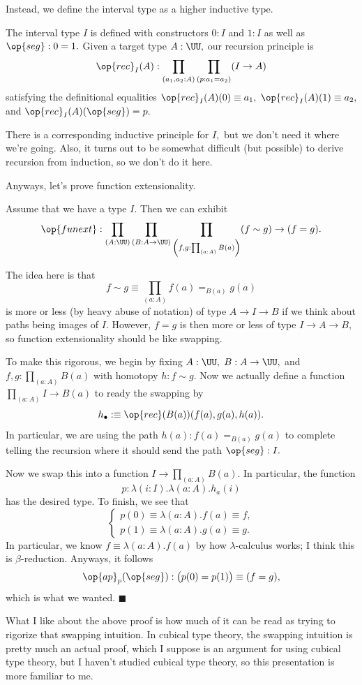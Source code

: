 Instead, we define the interval type as a higher inductive type.
\begin{definition}
    The interval type $I$ is defined with constructors $0:I$ and $1:I$ as well as $\op{seg}:0=1.$ Given a target type $A:\UU,$ our recursion principle is
    \[\op{rec}_I(A):\prod_{(a_1,a_2:A)}\prod_{(p:a_1=a_2)}(I\to A)\]
    satisfying the definitional equalities $\op{rec}_I(A)(0)\equiv a_1,$ $\op{rec}_I(A)(1)\equiv a_2,$ and $\op{rec}_I(A)(\op{seg})=p.$
\end{definition}
There is a corresponding inductive principle for $I,$ but we don't need it where we're going. Also, it turns out to be somewhat difficult (but possible) to derive recursion from induction, so we don't do it here.

Anyways, let's prove function extensionality.
\begin{proposition}
    Assume that we have a type $I.$ Then we can exhibit
    \[\op{funext}:\prod_{(A:\UU)}\prod_{(B:A\to\UU)}\prod_{\left(f,g:\prod_{(a:A)}B(a)\right)}(f\sim g)\to(f=g).\]
\end{proposition}
The idea here is that
\[f\sim g\equiv\prod_{(a:A)}f(a)=_{B(a)}g(a)\]
is more or less (by heavy abuse of notation) of type $A\to I\to B$ if we think about paths being images of $I.$ However, $f=g$ is then more or less of type $I\to A\to B,$ so function extensionality should be like swapping.

To make this rigorous, we begin by fixing $A:\UU,$ $B:A\to\UU,$ and $f,g:\prod_{(a:A)}B(a)$ with homotopy $h:f\sim g.$ Now we actually define a function $\prod_{(a:A)}I\to B(a)$ to ready the swapping by
\[h_\bullet:\equiv\op{rec}(B(a))(f(a),g(a),h(a)).\]
In particular, we are using the path $h(a):f(a)=_{B(a)}g(a)$ to complete telling the recursion where it should send the path $\op{seg}:I.$

Now we swap this into a function $I\to\prod_{(a:A)}B(a).$ In particular, the function
\[p:\lambda(i:I).\lambda(a:A).h_a(i)\]
has the desired type. To finish, we see that
\[\begin{cases}
    p(0)\equiv\lambda(a:A).f(a)\equiv f, \\
    p(1)\equiv\lambda(a:A).g(a)\equiv g.
\end{cases}\]
In particular, we know $f\equiv\lambda(a:A).f(a)$ by how $\lambda$-calculus works; I think this is $\beta$-reduction. Anyways, it follows
\[\op{ap}_p(\op{seg}):\big(p(0)=p(1)\big)\equiv(f=g),\]
which is what we wanted. $\blacksquare$

What I like about the above proof is how much of it can be read as trying to rigorize that swapping intuition. In cubical type theory, the swapping intuition is pretty much an actual proof, which I suppose is an argument for using cubical type theory, but I haven't studied cubical type theory, so this presentation is more familiar to me.

